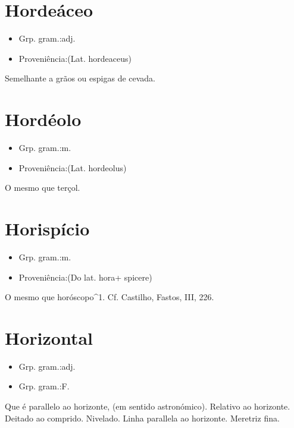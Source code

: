 \documentclass{article}
\begin{document}
\section{Hordeáceo}
\begin{itemize}
\item {Grp. gram.:adj.}
\end{itemize}
\begin{itemize}
\item {Proveniência:(Lat. \textunderscore hordeaceus\textunderscore )}
\end{itemize}
Semelhante a grãos ou espigas de cevada.
\section{Hordéolo}
\begin{itemize}
\item {Grp. gram.:m.}
\end{itemize}
\begin{itemize}
\item {Proveniência:(Lat. \textunderscore hordeolus\textunderscore )}
\end{itemize}
O mesmo que \textunderscore terçol\textunderscore .
\section{Horispício}
\begin{itemize}
\item {Grp. gram.:m.}
\end{itemize}
\begin{itemize}
\item {Proveniência:(Do lat. \textunderscore hora\textunderscore  + \textunderscore spicere\textunderscore )}
\end{itemize}
O mesmo que \textunderscore horóscopo\textunderscore ^1. Cf. Castilho, \textunderscore Fastos\textunderscore , III, 226.
\section{Horizontal}
\begin{itemize}
\item {Grp. gram.:adj.}
\end{itemize}
\begin{itemize}
\item {Grp. gram.:F.}
\end{itemize}
Que é parallelo ao horizonte, (em sentido astronómico).
Relativo ao horizonte.
Deitado ao comprido.
Nivelado.
Linha parallela ao horizonte.
Meretriz fina.
\end{document}
